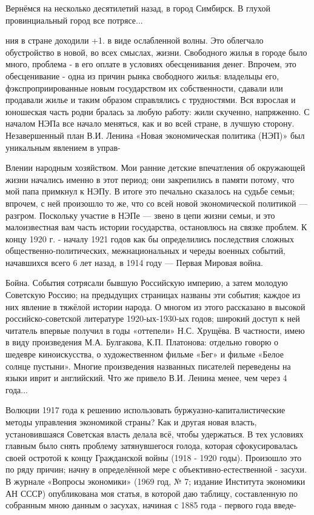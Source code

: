 

Вернёмся на несколько десятилетий назад, в город Симбирск. В глухой провинциальный город все потрясе...

ния в стране доходили +1. в виде ослабленной волны. Это облегчало обустройство в новой, во всех смыслах, жизни. Свободного жилья в городе было много, проблема - в его оплате в условиях обесценивания денег. Впрочем, это обесценивание - одна из причин рынка свободного жилья: владельцы его, фэкспроприированные новым государством их собственности, сдавали или продавали жилье и таким образом справлялись с трудностями. Вся взрослая и юношеская часть родни бралась за любую работу: жили скученно, напряженно. С началом НЭПа все начало меняться, как и во всей стране, в лучшую сторону. Незавершенный план В.И. Ленина «Новая экономическая политика (НЭП)» был уникальным явлением в управ-

Влении народным хозяйством. Мои ранние детские впечатления об окружающей жизни начались именно в этот период; они закрепились в памяти потому, что мой папа примкнул к НЭПу. В итоге это печально сказалось на судьбе семьи; впрочем, с ней произошло то же, что со всей новой экономической политикой — разгром. Поскольку участие в НЭПе — звено в цепи жизни семьи, и это малоизвестная вам часть истории государства, остановлюсь на связке проблем. К концу 1920 г. - началу 1921 годов как бы определились последствия сложных общественно-политических, межнациональных и череды военных событий, начавшихся всего 6 лет назад, в 1914 году — Первая Мировая война.

Бойна. События сотрясали бывшую Российскую империю, а затем молодую Советскую Россию; на предыдущих страницах названы эти события; каждое из них явление в тяжёлой истории народа. О многом из этого рассказано в высокой российско-советской литературе 1920-ых-1930-ых годов; широкий доступ к ней читатель впервые получил в годы «оттепели» Н.С. Хрущёва. В частности, имею в виду произведения М.А. Булгакова, К.П. Платонова: отдельно говорю о шедевре киноискусства, о художественном фильме «Бег» и фильме «Белое солнце пустыни». Многие произведения названных писателей переведены на языки иврит и английский. Что же привело В.И. Ленина менее, чем через 4 года...

Волюции 1917 года к решению использовать буржуазно-капиталистические методы управления экономикой страны? Как и другая новая власть, установившаяся Советская власть делала всё, чтобы удержаться. В тех условиях главным было снять проблему затянувшегося голода, которая сфокусировалась своей остротой к концу Гражданской войны (1918 - 1920 годы). Произошло это по ряду причин; начну в определённой мере с объективно-естественной - засухи. В журнале «Вопросы экономики» (1969 год, № 7; издание Института экономики АН СССР) опубликована моя статья, в которой даю таблицу, составленную по собранным мною данным о засухах, начиная с 1885 года - первого года введе-

